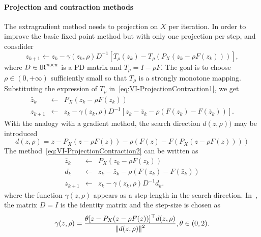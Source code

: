 \paragraph{Projection and contraction methods} The extragradient method needs to projection on $X$ per iteration. In order to improve the basic fixed point method but with only one projection per step, \citet{Solodov.Tseng1996} and \citet{He_AMO1997} consdider
\begin{equation}
  \label{eq:VI-ProjectionContraction1}
  z_{k+1}\leftarrow z_k- \gamma(z_k,\rho) D^{-1}\left[T_{\rho}(z_k)-T_{\rho}(P_X(z_k-\rho F(z_k)) )\right],
\end{equation}
where $D\in \mathrm{I\!R}^{n\times n}$ is a PD matrix and  $T_\rho=I-\rho F$. The goal is to choose $\rho \in (0,+\infty)$ sufficiently small so that $T_\rho$ is a strongly monotone mapping. Substituting the expression of $T_\rho$ in~\eqref{eq:VI-ProjectionContraction1}, we get
\begin{equation}
  \label{eq:VI-ProjectionContraction2}
  \begin{array}{lcl}
    \bar z_{k} &\leftarrow& P_X(z_k-\rho F(z_k))\\
    z_{k+1} &\leftarrow& z_k - \gamma(z_k,\rho) D^{-1}\left[z_k-\bar z_k - \rho( F(z_k)- F(\bar z_k))\right].
  \end{array}
\end{equation}
With the analogy with a gradient method,  the search direction $d(z,\rho))$ may be introduced
\begin{equation}
  \label{eq:VI-projectionContraction3}
    d(z,\rho) = z- P_X(z-\rho F(z))  - \rho (F(z) - F(P_X(z-\rho F(z)))) 
  \end{equation}
The method~\eqref{eq:VI-ProjectionContraction2} can be written as 
\begin{equation}
  \label{eq:VI-projectionContraction4}
  \begin{array}{lcl}
    \bar z_{k} &\leftarrow& P_X(z_k-\rho F(z_k))\\
    d_k  &\leftarrow&  z_k - \bar z_k - \rho (F(z_k) - F(\bar z_k)) \\
    z_{k+1} &\leftarrow & z_k - \gamma(z_k,\rho) D^{-1} d_k.
  \end{array}
\end{equation}
where the function $\gamma(z,\rho)$ appears as a step-length in the search direction.
In~\citep{He_AMO1997}, the matrix $D=I$ is the identity matrix and the step-size is chosen as
\begin{equation}
  \label{eq:VI-projectionContraction5}
  \begin{array}{lcl}
    \gamma (z,\rho) = \Frac{\theta [ z - P_X(z-\rho F(z)) ]^\top d(z,\rho)}{\|d(z,\rho)\|^2}, \theta \in (0,2).
  \end{array}
\end{equation}
